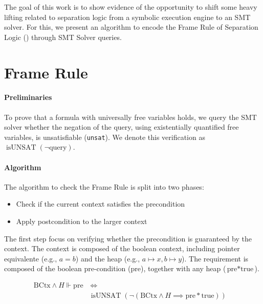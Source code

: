 \documentclass[sigplan,screen,review]{acmart}
\begin{document}
The goal of this work is to show evidence of the opportunity to shift some heavy lifting related to separation logic from a symbolic execution engine to an SMT solver. For this, we present an algorithm to encode the Frame Rule of Separation Logic () through SMT Solver queries.

\section{Frame Rule}

\paragraph{Preliminaries} To prove that a formula with universally free variables holds, we query the SMT solver whether the negation of the query, using existentially quantified free variables, is unsatisfiable (\texttt{unsat}). We denote this verification as $\operatorname{isUNSAT}(\neg\mbox{query})$.


\paragraph{Algorithm} The algorithm to check the Frame Rule is split into two phases: 

\begin{itemize}
    \item Check if the current context satisfies the precondition
    \item Apply postcondition to the larger context
\end{itemize}


The first step focus on verifying whether the precondition is guaranteed by the context. The context is composed of the boolean context, including pointer equivalente (e.g., $a=b$) and the heap (e.g., $a \mapsto x, b \mapsto y$). The requirement is composed of the boolean pre-condition (pre), together with any heap ($\text{pre} * \text{true}$).

\begin{align*}
\mbox{BCtx} \wedge H \Vdash \mbox{pre} & \, \iff & \\ & \operatorname{isUNSAT}(\neg(\mbox{BCtx} \wedge H \implies \mbox{pre} \mathbin{*} \mbox{true} ))
\end{align*}

\end{document}
